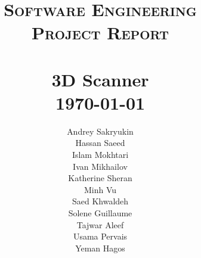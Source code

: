 \title{ \textsc{\textbf{Software Engineering}}
		\\ [0.5cm] 
		\normalsize \textsc{Project Report}
		\\
		[2.0cm]
		\HRule{0.5pt} \\
		\LARGE \textbf{3D Scanner}
		\HRule{2pt} \\ [0.5cm]
		\normalsize \today \vspace*{5\baselineskip}}

\date{}

\author{
      Andrey Sakryukin \\
      Hassan Saeed \\
      Islam Mokhtari\\
      Ivan Mikhailov\\
      Katherine Sheran\\
      Minh Vu \\
      Saed Khwaldeh \\
      Solene Guillaume \\
      Tajwar Aleef \\
      Usama Pervais \\
      Yeman Hagos \\ 
      \\
		}

\maketitle
\tableofcontents
\newpage

\sectionfont{\scshape}
